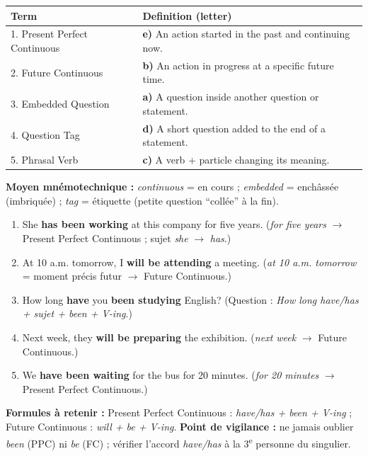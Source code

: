 \documentclass[11pt]{article}
\newcommand{\cle}[1]{{\popxbold\color{popdark}#1}}
\begin{document}
\begin{corrige}
\begin{center}
\begin{tabularx}{\linewidth}{|l|X|}\hline
\textbf{Term} & \textbf{Definition (letter)} \\ \hline
1. \cle{Present Perfect Continuous} & \textbf{e)} An action started in the past and continuing now. \\ \hline
2. \cle{Future Continuous} & \textbf{b)} An action in progress at a specific future time. \\ \hline
3. \cle{Embedded Question} & \textbf{a)} A question inside another question or statement. \\ \hline
4. \cle{Question Tag} & \textbf{d)} A short question added to the end of a statement. \\ \hline
5. \cle{Phrasal Verb} & \textbf{c)} A verb + particle changing its meaning. \\ \hline
\end{tabularx}
\end{center}
\textbf{Moyen mnémotechnique :} \emph{continuous} = en cours ; \emph{embedded} = enchâssée (imbriquée) ; \emph{tag} = étiquette (petite question ``collée'' à la fin).
\end{corrige}

\begin{corrige}
\begin{enumerate}
    \item She \textbf{has been working} at this company for five years. (\emph{for five years} $\rightarrow$ Present Perfect Continuous ; sujet \emph{she} $\rightarrow$ \emph{has}.)
    \item At 10 a.m. tomorrow, I \textbf{will be attending} a meeting. (\emph{at 10 a.m. tomorrow} = moment précis futur $\rightarrow$ Future Continuous.)
    \item How long \textbf{have} you \textbf{been studying} English? (Question : \emph{How long have/has + sujet + been + V-ing}.)
    \item Next week, they \textbf{will be preparing} the exhibition. (\emph{next week} $\rightarrow$ Future Continuous.)
    \item We \textbf{have been waiting} for the bus for 20 minutes. (\emph{for 20 minutes} $\rightarrow$ Present Perfect Continuous.)
\end{enumerate}
\textbf{Formules à retenir :} Present Perfect Continuous : \emph{have/has + been + V-ing} ; Future Continuous : \emph{will + be + V-ing}.
\textbf{Point de vigilance :} ne jamais oublier \emph{been} (PPC) ni \emph{be} (FC) ; vérifier l'accord \emph{have/has} à la 3\textsuperscript{e} personne du singulier.
\end{corrige}
\end{document}
